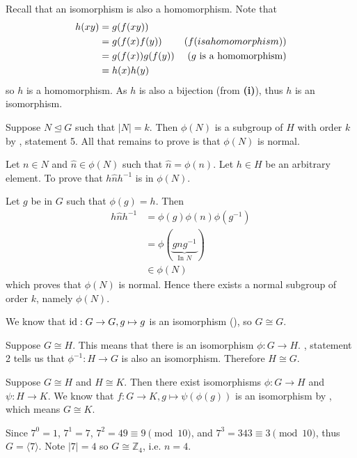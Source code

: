 \begin{questions}
\begin{partquestions}{\roman*}
        \item Recall that an isomorphism is also a homomorphism.  Note that
        \begin{align*}
            h(xy) &= g(f(xy))\\
            &= g(f(x)f(y)) & (f \text( is a homomorphism))\\
            &= g(f(x))g(f(y)) & (g \text{ is a homomorphism})\\
            &= h(x)h(y)
        \end{align*}
        so $h$ is a homomorphism. As $h$ is also a bijection (from \textbf{(i)}), thus $h$ is an isomorphism.
    \end{partquestions}

    \item Suppose $N \unlhd G$ such that $|N| = k$. Then $\phi(N)$ is a subgroup of $H$ with order $k$ by , statement 5. All that remains to prove is that $\phi(N)$ is normal.

    Let $n \in N$ and $\hat{n} \in \phi(N)$ such that $\hat{n} = \phi(n)$. Let $h \in H$ be an arbitrary element. To prove that $h\hat{n}h^{-1}$ is in $\phi(N)$.

    Let $g$ be in $G$ such that $\phi(g) = h$. Then
    \begin{align*}
        h\hat{n}h^{-1} &= \phi(g)\phi(n)\phi(g^{-1})\\
        &= \phi(\underbrace{gng^{-1}}_{\text{In } N})\\
        &\in \phi(N)
    \end{align*}
    which proves that $\phi(N)$ is normal. Hence there exists a normal subgroup of order $k$, namely $\phi(N)$.

    \item \begin{partquestions}{\alph*}
        \item We know that $\mathrm{id}: G \to G, g \mapsto g$ is an isomorphism (), so $G \cong G$.
        \item Suppose $G \cong H$. This means that there is an isomorphism $\phi: G \to H$. , statement 2 tells us that $\phi^{-1}: H \to G$ is also an isomorphism. Therefore $H \cong G$.
        \item Suppose $G \cong H$ and $H \cong K$. Then there exist isomorphisms $\phi: G \to H$ and $\psi: H \to K$. We know that $f: G \to K, g \mapsto \psi(\phi(g))$ is an isomorphism by , which means $G \cong K$.
    \end{partquestions}

    \item Since $7^0 = 1$, $7^1 = 7$, $7^2 = 49 \equiv 9 \pmod{10}$, and $7^3 = 343 \equiv 3 \pmod{10}$, thus $G = \langle 7 \rangle$. Note $|7| = 4$ so $G \cong \mathbb{Z}_4$, i.e. $n = 4$.
\end{questions}